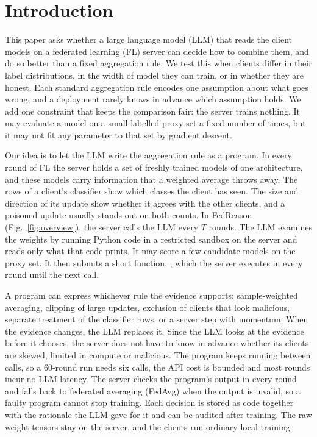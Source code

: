 \documentclass[3p,times,a4paper]{elsarticle}
\newcommand{\code}[1]{\texttt{\detokenize{#1}}}
\begin{document}
\section{Introduction}
\label{sec:intro}

This paper asks whether a large language model (LLM) that reads the client models on a federated learning (FL) server can decide how to combine them, and do so better than a fixed aggregation rule. We test this when clients differ in their label distributions, in the width of model they can train, or in whether they are honest. Each standard aggregation rule encodes one assumption about what goes wrong, and a deployment rarely knows in advance which assumption holds. We add one constraint that keeps the comparison fair: the server trains nothing. It may evaluate a model on a small labelled proxy set a fixed number of times, but it may not fit any parameter to that set by gradient descent.

Our idea is to let the LLM write the aggregation rule as a program. In every round of FL the server holds a set of freshly trained models of one architecture, and these models carry information that a weighted average throws away. The rows of a client's classifier show which classes the client has seen. The size and direction of its update show whether it agrees with the other clients, and a poisoned update usually stands out on both counts. In FedReason (Fig.~\ref{fig:overview}), the server calls the LLM every $T$ rounds. The LLM examines the weights by running Python code in a restricted sandbox on the server and reads only what that code prints. It may score a few candidate models on the proxy set. It then submits a short function, \code{aggregate(ctx)}, which the server executes in every round until the next call.

A program can express whichever rule the evidence supports: sample-weighted averaging, clipping of large updates, exclusion of clients that look malicious, separate treatment of the classifier rows, or a server step with momentum. When the evidence changes, the LLM replaces it. Since the LLM looks at the evidence before it chooses, the server does not have to know in advance whether its clients are skewed, limited in compute or malicious. The program keeps running between calls, so a 60-round run needs six calls, the API cost is bounded and most rounds incur no LLM latency. The server checks the program's output in every round and falls back to federated averaging (FedAvg) when the output is invalid, so a faulty program cannot stop training. Each decision is stored as code together with the rationale the LLM gave for it and can be audited after training. The raw weight tensors stay on the server, and the clients run ordinary local training.
\end{document}

